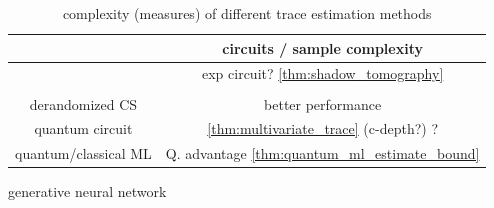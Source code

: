 \documentclass[
reprint,
aps,
pra,
floatfix,
]{revtex4-2}
\theoremstyle{plain}
\newtheorem{theorem}{Theorem}
\theoremstyle{definition}
\newcommand{\dm}{\rho}
\begin{document}
\begin{table}[!ht]
	\centering
	\begin{tabular}{c|c}
		& circuits / sample complexity \\
		\hline
		\nameref{prm:shadow_tomography} & exp circuit?  \cref{thm:shadow_tomography} \\  
		\nameref{def:classical_shadow} &  \\
		derandomized CS &  better performance \\  
		quantum circuit  &  \cref{thm:multivariate_trace} (c-depth?)  ? \\  
		quantum/classical ML  &  Q. advantage 
		\cref{thm:quantum_ml_estimate_bound} \\  
		\hline
	\end{tabular}
	\caption{complexity (measures) of different trace estimation methods}
\end{table}

generative neural network \cite{zhuFlexibleLearningQuantum2022}
	



\end{document}
